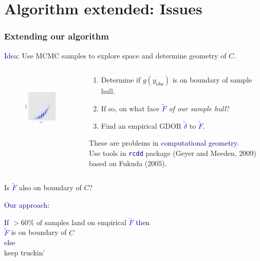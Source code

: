 \documentclass[ 10pt]{beamer}
\newcommand{\yobs}{y_{\text{obs}}}
\begin{document}
\section{Algorithm extended: Issues}
\frame
{
\frametitle{Extending our algorithm}  

\textcolor{darkblue}{Idea}: Use MCMC samples to explore space and determine geometry of $C$.
\begin{columns}[]
\begin{column}[T]{0.23\textwidth}
\begin{figure}[h]
\centering
\includegraphics[height=1.3in, trim=2.5in 1in 1in 1.9in, clip = true ]{MCsample-interiorptonF} %
\end{figure}
\end{column}

\begin{column}[t]{0.77\textwidth}

\begin{enumerate}
\item Determine if $g(\yobs)$ is on boundary of sample hull.
\vspace{1mm}
\item If so, on what face \textcolor{blue}{$\tilde{F}$} \emph{of our sample hull}?
\vspace{1mm}
\item Find an empirical GDOR \textcolor{blue}{$\tilde{\delta}$} to \textcolor{blue}{$\tilde{F}$}.   
\end{enumerate}
\vspace{1mm}
These are problems in \textcolor{darkblue}{computational geometry}.  \\
Use tools in \textcolor{darkblue}{\texttt{rcdd}} package (Geyer and Meeden, 2009) based on Fukuda (2005).
\end{column}
\end{columns}
\vspace{2mm}

\pause

\begin{block}{Is \textcolor{blue}{$\tilde{F}$} also on boundary of $C$?}  
\vspace{1mm}

\textcolor{darkblue}{Our approach:}

\textcolor{darkblue}{If} $>60\%$ of samples land on empirical \textcolor{blue}{$\tilde{F}$} 
\textcolor{darkblue}{then}\\
\hspace{2mm} \textcolor{blue}{$\tilde{F}$} is on boundary of $C$ \\
\textcolor{darkblue}{else} \\
\hspace{2mm} keep truckin'
\end{block}
}
\end{document}
